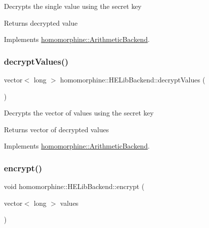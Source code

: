 Decrypts the single value using the secret key

\begin{DoxyReturn}{Returns}
decrypted value 
\end{DoxyReturn}


Implements \hyperlink{classhomomorphine_1_1_arithmetic_backend_af4aad032c46ce51e608092ac206882bd}{homomorphine\+::\+Arithmetic\+Backend}.

\mbox{\label{classhomomorphine_1_1_h_e_lib_backend_a650d87bee6056a404f8ab81ec0f84980}} 
\subsubsection{\texorpdfstring{decrypt\+Values()}{decryptValues()}}
{\footnotesize\ttfamily vector$<$ long $>$ homomorphine\+::\+H\+E\+Lib\+Backend\+::decrypt\+Values (\begin{DoxyParamCaption}{ }\end{DoxyParamCaption})\hspace{0.3cm}{\ttfamily [virtual]}}

Decrypts the vector of values using the secret key

\begin{DoxyReturn}{Returns}
vector of decrypted values 
\end{DoxyReturn}


Implements \hyperlink{classhomomorphine_1_1_arithmetic_backend_a2fb1ce64e74c4930b7d364ce3b9cc8fe}{homomorphine\+::\+Arithmetic\+Backend}.

\mbox{\label{classhomomorphine_1_1_h_e_lib_backend_ae142417734796968fe66c4b6174d2b8a}} 
\subsubsection{\texorpdfstring{encrypt()}{encrypt()}\hspace{0.1cm}{\footnotesize\ttfamily [1/2]}}
{\footnotesize\ttfamily void homomorphine\+::\+H\+E\+Lib\+Backend\+::encrypt (\begin{DoxyParamCaption}\item[{vector$<$ long $>$}]{values }\end{DoxyParamCaption})\hspace{0.3cm}{\ttfamily [virtual]}}

